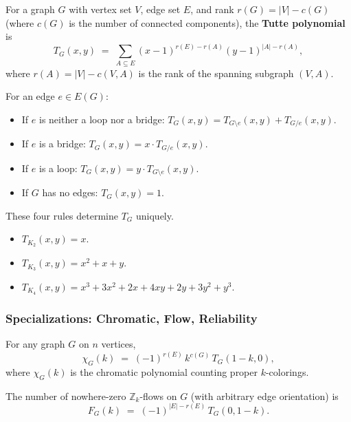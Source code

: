 \begin{definition}\label{def:tutte}
For a graph $G$ with vertex set $V$, edge set $E$, and rank
$r(G) = |V| - c(G)$ (where $c(G)$ is the number of connected
components), the \textbf{Tutte polynomial} is
\[
  T_G(x, y) \;=\; \sum_{A \subseteq E} (x - 1)^{r(E) - r(A)} (y - 1)^{|A| - r(A)},
\]
where $r(A) = |V| - c(V, A)$ is the rank of the spanning subgraph
$(V, A)$.
\end{definition}

\begin{theorem}\label{thm:tuttedc}
For an edge $e \in E(G)$:
\begin{itemize}
  \item If $e$ is neither a loop nor a bridge:
        $T_G(x, y) = T_{G \setminus e}(x, y) + T_{G / e}(x, y)$.
  \item If $e$ is a bridge: $T_G(x, y) = x \cdot T_{G / e}(x, y)$.
  \item If $e$ is a loop: $T_G(x, y) = y \cdot T_{G \setminus e}(x, y)$.
  \item If $G$ has no edges: $T_G(x, y) = 1$.
\end{itemize}
These four rules determine $T_G$ uniquely.
\end{theorem}

\begin{example}
\mbox{}
\begin{itemize}
  \item $T_{K_2}(x, y) = x$.
  \item $T_{K_3}(x, y) = x^2 + x + y$.
  \item $T_{K_4}(x, y) = x^3 + 3x^2 + 2x + 4xy + 2y + 3y^2 + y^3$.
\end{itemize}
\end{example}

\subsubsection{Specializations: Chromatic, Flow, Reliability}

\begin{theorem}\label{thm:tuttechrom}
For any graph $G$ on $n$ vertices,
\[
  \chi_G(k) \;=\; (-1)^{r(E)}\, k^{c(G)} \, T_G(1 - k, 0),
\]
where $\chi_G(k)$ is the chromatic polynomial counting proper
$k$-colorings.
\end{theorem}

\begin{theorem}
The number of nowhere-zero $\mathbb Z_k$-flows on $G$ (with arbitrary
edge orientation) is
\[
  F_G(k) \;=\; (-1)^{|E| - r(E)}\, T_G(0, 1 - k).
\]
\end{theorem}

